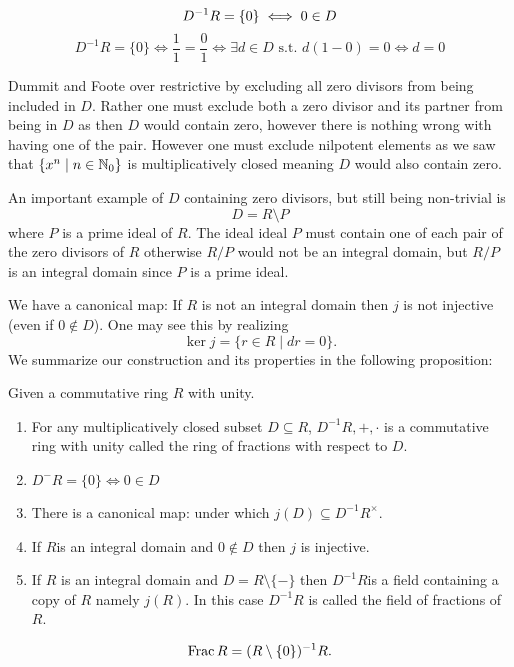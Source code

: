 \documentclass[master.tex]{subfiles}
\begin{document}
  \begin{rmk*}
      \[D^{-1}R = \{0\} \iff 0 \in D\\\]
      \[D^{-1}R = \{0\} \iff \frac{1}{1}=\frac{0}{1} \iff \exists d \in D \text{ s.t. } d(1-0)=0 \iff d=0\]
  \end{rmk*}
  Dummit and Foote over restrictive by excluding all zero divisors from being included in \(D\). Rather one must exclude
  both a zero divisor and its partner from being in \(D\) as then \(D\) would contain zero, however there is nothing
  wrong with having one of the pair. However one must exclude nilpotent elements as we saw that \(\{x^n \mid n \in
  {\mathbb N}_0\}\) is multiplicatively closed meaning \(D\) would also contain zero. 
  \begin{example*}
    An important example of \(D\) containing zero divisors, but still being non-trivial is 
    \[D=R \setminus P\]
    where \(P\) is a prime ideal of \(R\). The ideal ideal \(P\) must contain one of each pair of the zero divisors of
    \(R\) otherwise \(R/P\) would not be an integral domain, but \(R/P\) is an integral domain since \(P\) is a prime ideal.
  \end{example*}
  We have a canonical map: 
  If \(R\) is not an integral domain then \(j\) is not injective (even if \(0 \not \in D\)). One may see this by
  realizing 
  \[\ker j = \{r \in R \mid dr = 0\}.\]
  We summarize our construction and its properties in the following proposition:
  \begin{prop}Given a commutative ring \(R\) with unity.
    \begin{enumerate}[label=(\alph*)]
    \item For any multiplicatively closed subset \(D \subseteq R\), \(D^{-1}R,+,\cdot\) is a commutative ring with
      unity called the ring of fractions with respect to \(D\).
    \item \(D^{-}R=\{0\}\iff 0 \in D\)
    \item There is a canonical map:   under which \(j(D) \subseteq
      D^{-1}R^\times\).
    \item If \(R\)is an integral domain and \(0 \not \in D\) then \(j\) is injective.
    \item If \(R\) is an integral domain and \(D=R \setminus \{-\}\) then \(D^{-1}R\)is a field containing a copy of \(R
     \) namely \(j(R)\). In this case \(D^{-1}R\) is called the field of fractions of \(R\).
    \end{enumerate}
    \begin{notation}
    \[\operatorname{Frac}{R}=(R\setminus\{0\})^{-1}R.\]
  \end{notation}
  \end{prop}
\end{document}
